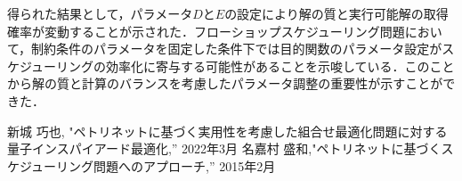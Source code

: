 \documentclass[conference]{IEEEtran}
\begin{document}
得られた結果として，パラメータ$D$と$E$の設定により解の質と実行可能解の取得確率が変動することが示された．フローショップスケジューリング問題において，制約条件のパラメータを固定した条件下では目的関数のパラメータ設定がスケジューリングの効率化に寄与する可能性があることを示唆している．このことから解の質と計算のバランスを考慮したパラメータ調整の重要性が示すことができた．

\begin{thebibliography}{00}
 新城 巧也, "ペトリネットに基づく実用性を考慮した組合せ最適化問題に対する量子インスパイアード最適化,'' 2022年3月
名嘉村 盛和,"ペトリネットに基づくスケジューリング問題へのアプローチ,'' 2015年2月
\end{thebibliography}
\end{document}
